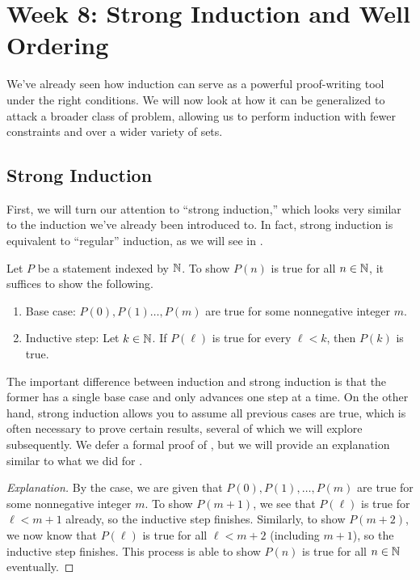 \documentclass[../main.tex]{subfiles}
\begin{document}
\section{Week 8: Strong Induction and Well Ordering}
We've already seen how induction can serve as a powerful proof-writing tool under the right conditions. We will now look at how it can be generalized to attack a broader class of problem, allowing us to perform induction with fewer constraints and over a wider variety of sets.

\subsection{Strong Induction}
First, we will turn our attention to ``strong induction,'' which looks very similar to the induction we've already been introduced to. In fact, strong induction is equivalent to ``regular'' induction, as we will see in .
\begin{theorem}
    Let $P$ be a statement indexed by $\mathbb N$. To show $P(n)$ is true for all $n \in \mathbb N$, it suffices to show the following.
    \begin{enumerate}
        \item Base case: $P(0), P(1) \dots, P(m)$ are true for some nonnegative integer $m$.
        \item Inductive step: Let $k \in \mathbb N$. If $P(\ell)$ is true for every $\ell < k$, then $P(k)$ is true.
    \end{enumerate}
\end{theorem}
The important difference between induction and strong induction is that the former has a single base case and only advances one step at a time. On the other hand, strong induction allows you to assume all previous cases are true, which is often necessary to prove certain results, several of which we will explore subsequently. We defer a formal proof of , but we will provide an explanation similar to what we did for .
\begin{proof}[Explanation]
    By the case, we are given that $P(0),P(1),\ldots,P(m)$ are true for some nonnegative integer $m$. To show $P(m+1)$, we see that $P(\ell)$ is true for $\ell<m+1$ already, so the inductive step finishes. Similarly, to show $P(m+2)$, we now know that $P(\ell)$ is true for all $\ell<m+2$ (including $m+1$), so the inductive step finishes. This process is able to show $P(n)$ is true for all $n\in\mathbb N$ eventually.
\end{proof}
\end{document}
